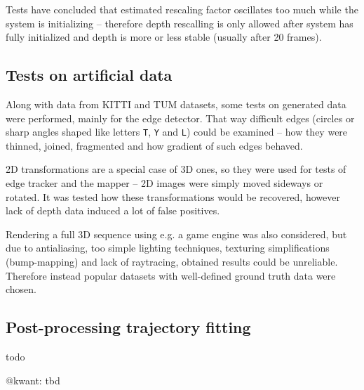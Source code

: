 Tests have concluded that estimated rescaling factor oscillates too much while the system is initializing -- therefore depth rescalling is only allowed after system has fully initialized and depth is more or less stable (usually after 20 frames).

\subsection{Tests on artificial data}

Along with data from KITTI and TUM datasets, some tests on generated data were performed, mainly for the edge detector. That way difficult edges (circles or sharp angles shaped like letters \texttt{T}, \texttt{Y} and \texttt{L}) could be examined -- how they were thinned, joined, fragmented and how gradient of such edges behaved.

2D transformations are a special case of 3D ones, so they were used for tests of edge tracker and the mapper -- 2D images were simply moved sideways or rotated. It was tested how these transformations would be recovered, however lack of depth data induced a lot of false positives.

Rendering a full 3D sequence using e.g. a game engine was also considered, but due to antialiasing, too simple lighting techniques, texturing simplifications (bump-mapping) and lack of raytracing, obtained results could be unreliable. Therefore instead popular datasets with well-defined ground truth data were chosen.


\subsection{Post-processing trajectory fitting}


todo \cite{arun1987least}

@kwant: tbd


